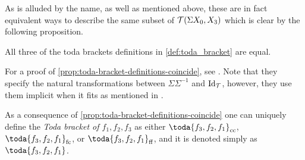 As is alluded by the name, as well as mentioned above, these are in fact equivalent ways to describe the same subset of \( {\mathcal{T}}(\Sigma X_0, X_3) \) which is clear by the following proposition.

\begin{proposition}
    \label{prop:toda-bracket-definitions-coincide}
    All three of the toda brackets definitions in \autoref{def:toda_bracket} are equal.
\end{proposition}

For a proof of \autoref{prop:toda-bracket-definitions-coincide}, see \cite[Proposition 3.3]{Christensen-Frankland_2017}. Note that they specify the natural transformations between \( \Sigma \Sigma^{-1} \) and \( \operatorname{Id}_{{\mathcal{T}}} \), however, they use them implicit when it fits as mentioned in \cite[Start of Section 2]{Christensen-Frankland_2017}.

As a consequence of \autoref{prop:toda-bracket-definitions-coincide} one can uniquely define the \emph{Toda bracket of \( f_1, f_2, f_3 \)} as either \( \toda{f_3, f_2, f_1}_{\cc} \), \( \toda{f_3, f_2, f_1}_{\fc} \), or \( \toda{f_3, f_2, f_1}_{\ff} \), and it is denoted simply as \emph{\( \toda{f_3, f_2, f_1} \)}.

